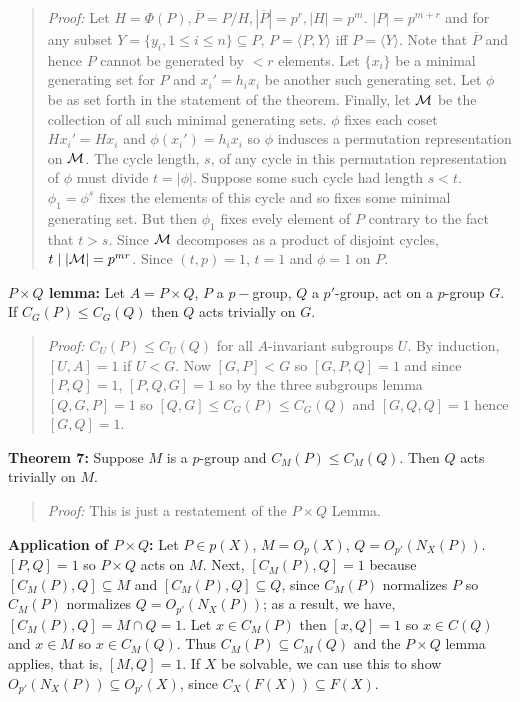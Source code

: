 \begin{quote}
\emph{Proof:}  Let $H= \Phi(P), {\overline P}= P/H, |{\overline P}|= p^r, |H|= p^m$.
$|P|= p^{m+r}$ and for any subset $Y= \{ y_i, 1 \le i \le n \} \subseteq P$,
$P= \langle P, Y \rangle$ iff $P= \langle Y \rangle$.  Note that ${\overline P}$ and
hence $P$ cannot be generated by $<r$ elements.  Let $\{ x_i \}$ be a minimal generating
set for $P$ and $x_i'= h_i x_i$ be another such generating set.  Let $\phi$ be as set forth in the
statement of the theorem.  Finally, let ${\cal M}$ be the collection of all such minimal generating
sets.  $\phi$ fixes each coset  $H x_i'= H x_i$ and $\phi(x_i')= h_i x_i$ so $\phi$
indusces a permutation representation on ${\cal M}$.  The cycle length, $s$, of any cycle in this
permutation representation of $\phi$ must divide $t= | \phi |$.  Suppose some such cycle
had length $s<t$.  $\phi_1= \phi^s$ fixes the elements of this cycle and so fixes some
minimal generating set.  But then $\phi_1$ fixes evely element of $P$ contrary
to the fact that $t>s$.  Since ${\cal M}$ decomposes as a product of disjoint cycles,
$t \mid |{\cal M}| = p^{mr}$.  Since $(t,p)= 1$, $t=1$ and $\phi= 1$ on $P$.
\end{quote}
{\bf $P \times Q$ lemma:} Let $A = P \times Q$, $P$ a $p-$group, $Q$ a $p'$-group, act
on a $p$-group $G$.  If $C_G(P) \le C_G(Q)$ then $Q$ acts trivially on $G$.
\begin{quote}
\emph{Proof:}
$C_U(P) \le C_U(Q)$ for all $A$-invariant subgroups $U$.  By induction, $[U,A]=1$ if
$U < G$.  Now $[G,P] < G$ so $[G, P, Q] = 1$ and since $[P, Q]=1$,
$[P, Q, G]=1$ so by the three subgroups lemma $[Q, G, P]=1$ so
$[Q,G] \le C_G(P) \le C_G(Q)$ and $[G, Q, Q]=1$ hence $[G,Q]=1$.
\end{quote}
{\bf Theorem 7:} Suppose $M$ is a $p$-group and $C_M(P) \le C_M(Q)$.  Then $Q$ acts trivially on $M$.
\begin{quote}
\emph{Proof:}  This is just a restatement of the $P \times Q$ Lemma.
\end{quote}
{\bf Application of $P \times Q$:}  Let $P \in p(X)$, $M=O_p(X)$, $Q= O_{p'}(N_X(P))$.  $[P, Q]=1$ so
$P \times Q$ acts on $M$.  Next, $[C_M(P), Q] = 1$ because $[C_M(P), Q] \subseteq M$ and $[C_M(P), Q] \subseteq Q$, since
$C_M(P)$ normalizes $P$ so $C_M(P)$ normalizes $Q=O_{p'}(N_X(P))$; as a result, we have,
$[C_M(P), Q] = M \cap Q = 1$.
Let $x \in C_M(P)$ then $[x, Q] = 1$ so $x \in C(Q)$ and $x \in M$ so
$x \in C_M(Q)$.  Thus $C_M(P) \subseteq C_M(Q)$ and the $P \times Q$ lemma applies, that is, $[M,Q]=1$.
If $X$ be solvable, we can use this to show $O_{p'}(N_X(P)) \subseteq O_{p'}(X)$, since $C_X(F(X)) \subseteq F(X)$.
